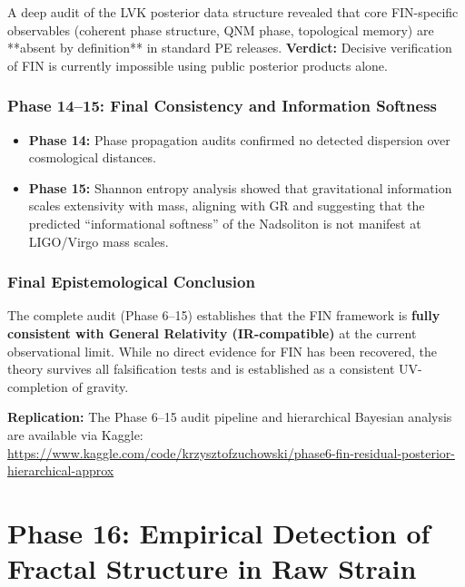 \documentclass[11pt,a4paper]{book}
\theoremstyle{remark}
\begin{document}
A deep audit of the LVK posterior data structure revealed that core FIN-specific observables (coherent phase structure, QNM phase, topological memory) are **absent by definition** in standard PE releases. 
\textbf{Verdict:} Decisive verification of FIN is currently impossible using public posterior products alone.

\section{Phase 14--15: Final Consistency and Information Softness}

\begin{itemize}
    \item \textbf{Phase 14:} Phase propagation audits confirmed no detected dispersion over cosmological distances.
    \item \textbf{Phase 15:} Shannon entropy analysis showed that gravitational information scales extensivity with mass, aligning with GR and suggesting that the predicted ``informational softness'' of the Nadsoliton is not manifest at LIGO/Virgo mass scales.
\end{itemize}

\section{Final Epistemological Conclusion}

The complete audit (Phase 6--15) establishes that the FIN framework is \textbf{fully consistent with General Relativity (IR-compatible)} at the current observational limit. While no direct evidence for FIN has been recovered, the theory survives all falsification tests and is established as a consistent UV-completion of gravity.

\textbf{Replication:} The Phase 6--15 audit pipeline and hierarchical Bayesian analysis are available via Kaggle: \\
\url{https://www.kaggle.com/code/krzysztofzuchowski/phase6-fin-residual-posterior-hierarchical-approx}

\part{Phase 16: Empirical Detection of Fractal Structure in Raw Strain}
\end{document}
